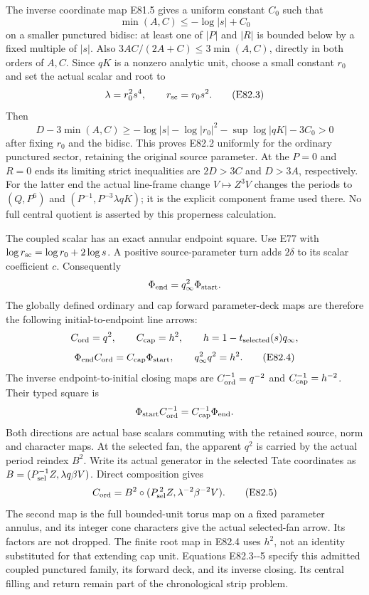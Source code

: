 The inverse coordinate map E81.5 gives a uniform constant
\(C_0\) such that
\[
 \min(A,C)\le-\log|s|+C_0
\]
on a smaller punctured bidisc: at least one of \(|P|\)
and \(|R|\) is bounded below by a fixed multiple of
\(|s|\). Also \(3AC/(2A+C)\le3\min(A,C)\), directly
in both orders of \(A,C\).
Since \(qK\) is a nonzero analytic unit, choose a small
constant \(r_0\) and set the actual scalar and root to
\[
                  \lambda=r_0^2s^4,\qquad
                  r_{\rm sc}=r_0s^2.           \tag{E82.3}
\]
Then
\[
 D-3\min(A,C)\ge-\log|s|
      -\log|r_0|^2-\sup\log|qK|-3C_0>0
\]
after fixing \(r_0\) and the bidisc. This proves E82.2
uniformly for the ordinary punctured sector, retaining
the original source parameter.
At the \(P=0\) and \(R=0\) ends its limiting strict
inequalities are \(2D>3C\) and \(D>3A\), respectively.
For the latter end the actual line-frame change
\(V\mapsto Z^3V\) changes the periods to
\((Q,P^6)\) and \((P^{-1},P^{-3}\lambda qK)\);
it is the explicit component frame used there.
No full central quotient is asserted by this properness
calculation.

The coupled scalar has an exact annular endpoint square.
Use E77 with \(\log r_{\rm sc}=\log r_0+2\log s\).
A positive source-parameter turn adds \(2\delta\) to its
scalar coefficient \(c\). Consequently
\[
                 \Phi_{\rm end}
                         =q_\infty^2\Phi_{\rm start}.
\]
The globally defined ordinary and cap forward parameter-deck
maps are therefore the following initial-to-endpoint line arrows:
\[
 C_{\rm ord}=q^2,\qquad C_{\rm cap}=h^2,\qquad
 h=1-t_{\rm selected}(s)q_\infty,
\]
\[
       \Phi_{\rm end}C_{\rm ord}
                        =C_{\rm cap}\Phi_{\rm start},
       \qquad q_\infty^2q^2=h^2.                \tag{E82.4}
\]
The inverse endpoint-to-initial closing maps are
\(C_{\rm ord}^{-1}=q^{-2}\) and
\(C_{\rm cap}^{-1}=h^{-2}\). Their typed square is
\[
 \Phi_{\rm start}C_{\rm ord}^{-1}
       =C_{\rm cap}^{-1}\Phi_{\rm end}.
\]
Both directions are actual base scalars commuting with the retained
source, norm and character maps. At the selected fan,
the apparent \(q^2\) is carried by the actual period
reindex \(B^2\). Write its actual generator in the selected Tate
coordinates as
\(B=(P_{\rm sel}^{-1}Z,\lambda q\beta V)\). Direct composition gives
\[
 C_{\rm ord}
       =B^2\circ(P_{\rm sel}^{\,2}Z,
                            \lambda^{-2}\beta^{-2}V).          \tag{E82.5}
\]
The second map is the full bounded-unit torus map on a
fixed parameter annulus, and its integer cone characters
give the actual selected-fan arrow. Its factors are not
dropped. The finite root map in E82.4 uses \(h^2\), not
an identity substituted for that extending cap unit.
Equations E82.3-\/-5 specify this admitted coupled
punctured family, its forward deck, and its inverse closing. Its central filling
and return remain part of the chronological strip problem.

